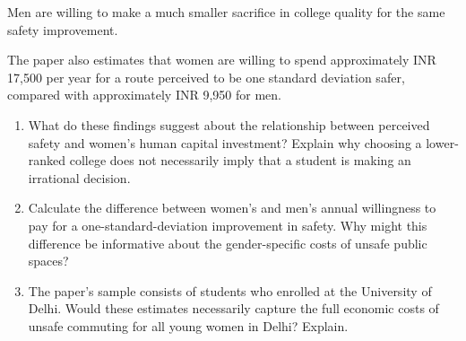 \documentclass[12pt]{article}
\begin{document}
\begin{enumerate}
Men are willing to make a much smaller sacrifice in
college quality for the same safety improvement.

The paper also estimates that women are willing to
spend approximately INR 17,500 per year for a route
perceived to be one standard deviation safer, compared
with approximately INR 9,950 for men.

\begin{enumerate}

\item What do these findings suggest about the relationship
between perceived safety and women's human capital
investment? Explain why choosing a lower-ranked college
does not necessarily imply that a student is making
an irrational decision.

\vspace{4cm}

\item Calculate the difference between women's and men's
annual willingness to pay for a one-standard-deviation
improvement in safety. Why might this difference be
informative about the gender-specific costs of unsafe
public spaces?

%
%
\vspace{4cm}

\item The paper's sample consists of students who enrolled
at the University of Delhi. Would these estimates
necessarily capture the full economic costs of unsafe
commuting for all young women in Delhi? Explain.

\vspace{4cm}


\end{enumerate}
\end{enumerate}
\end{document}
